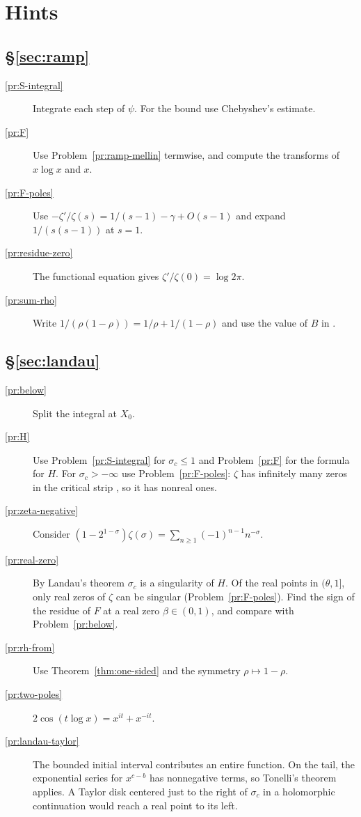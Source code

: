 \documentclass[reqno]{amsart}
\theoremstyle{definition}
\theoremstyle{plain}
\begin{document}
\section*{Hints}

\subsection*{\S\ref{sec:ramp}}
\begin{description}
\item[\ref{pr:S-integral}] Integrate each step of $\psi$.  For the bound use Chebyshev's estimate.
\item[\ref{pr:F}] Use Problem~\ref{pr:ramp-mellin} termwise, and compute the transforms of $x \log x$ and $x$.
\item[\ref{pr:F-poles}] Use $-\zeta'/\zeta(s) = 1/(s-1) - \gamma + O(s - 1)$ and expand $1/(s(s-1))$ at $s = 1$.
\item[\ref{pr:residue-zero}] The functional equation gives $\zeta'/\zeta(0) = \log 2\pi$.
\item[\ref{pr:sum-rho}] Write $1/(\rho(1-\rho)) = 1/\rho + 1/(1 - \rho)$ and use the value of $B$ in \cite[Ch.~12]{Dav}.
\end{description}

\subsection*{\S\ref{sec:landau}}
\begin{description}
\item[\ref{pr:below}] Split the integral at $X_0$.
\item[\ref{pr:H}] Use Problem~\ref{pr:S-integral} for $\sigma_c \le 1$ and Problem~\ref{pr:F} for the formula for $H$.  For $\sigma_c > -\infty$ use Problem~\ref{pr:F-poles}: $\zeta$ has infinitely many zeros in the critical strip \cite[Ch.~12]{Dav}, so it has nonreal ones.
\item[\ref{pr:zeta-negative}] Consider $(1 - 2^{1-\sigma})\zeta(\sigma) = \sum_{n \ge 1} (-1)^{n-1} n^{-\sigma}$.
\item[\ref{pr:real-zero}] By Landau's theorem $\sigma_c$ is a singularity of $H$.  Of the real points in $(\theta, 1]$, only real zeros of $\zeta$ can be singular (Problem~\ref{pr:F-poles}).  Find the sign of the residue of $F$ at a real zero $\beta \in (0,1)$, and compare with Problem~\ref{pr:below}.
\item[\ref{pr:rh-from}] Use Theorem~\ref{thm:one-sided} and the symmetry $\rho \mapsto 1 - \rho$.
\item[\ref{pr:two-poles}] $2\cos(t\log x) = x^{it} + x^{-it}$.
\item[\ref{pr:landau-taylor}] The bounded initial interval contributes an entire function.  On the tail, the exponential series for $x^{c-b}$ has nonnegative terms, so Tonelli's theorem applies.  A Taylor disk centered just to the right of $\sigma_c$ in a holomorphic continuation would reach a real point to its left.
\end{description}
\end{document}
